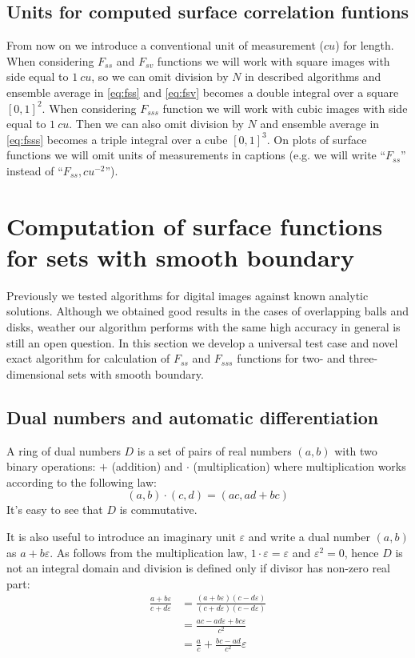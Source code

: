 \documentclass[reprint,amsmath,amssymb,aps,pre,showkeys,showpacs]{revtex4-1}
\begin{document}
\subsection{Units for computed surface correlation funtions}
From now on we introduce a conventional unit of measurement ($cu$) for length.
When considering $F_{ss}$ and $F_{sv}$ functions we will work with square images
with side equal to $1\ cu$, so we can omit division by $N$ in described
algorithms and ensemble average in \cref{eq:fss} and \cref{eq:fsv} becomes a
double integral over a square $[0, 1]^2$. When considering $F_{sss}$ function we
will work with cubic images with side equal to $1\ cu$. Then we can also omit
division by $N$ and ensemble average in \cref{eq:fsss} becomes a triple integral
over a cube $[0, 1]^3$. On plots of surface functions we will omit units of
measurements in captions (e.g. we will write ``$F_{ss}$'' instead of
``$F_{ss}, cu^{-2}$'').

\section{Computation of surface functions for sets with smooth boundary}
\label{sec:algo-precise}
Previously \cite{Samarin} we tested algorithms for digital images against known
analytic solutions. Although we obtained good results in the cases of
overlapping balls and disks, weather our algorithm performs with the same high
accuracy in general is still an open question. In this section we develop a
universal test case and novel exact algorithm for calculation of $F_{ss}$ and
$F_{sss}$ functions for two- and three-dimensional sets with smooth boundary.

\subsection{Dual numbers and automatic differentiation}
\label{sec:dual}
A ring of dual numbers $D$ is a set of pairs of real numbers $(a, b)$ with two
binary operations: $+$ (addition) and $\cdot$ (multiplication) where
multiplication works according to the following law:
\begin{equation*}
  (a, b)\cdot(c, d) = (ac, ad + bc)
\end{equation*}
It's easy to see that $D$ is commutative.

It is also useful to introduce an imaginary unit $\varepsilon$ and write a dual
number $(a, b)$ as $a + b\varepsilon$. As follows from the multiplication law,
$1\cdot \varepsilon = \varepsilon$ and $\varepsilon^2 = 0$, hence $D$ is not an
integral domain and division is defined only if divisor has non-zero real part:
\begin{align*}
  \frac{a+b\varepsilon}{c+d\varepsilon} &=
  \frac{(a+b\varepsilon)(c-d\varepsilon)}{(c+d\varepsilon)(c-d\varepsilon)} \\
  &= \frac{ac-ad\varepsilon+bc\varepsilon}{c^2} \\
  &= \frac{a}{c} + \frac{bc-ad}{c^2}\varepsilon
\end{align*}
\end{document}

